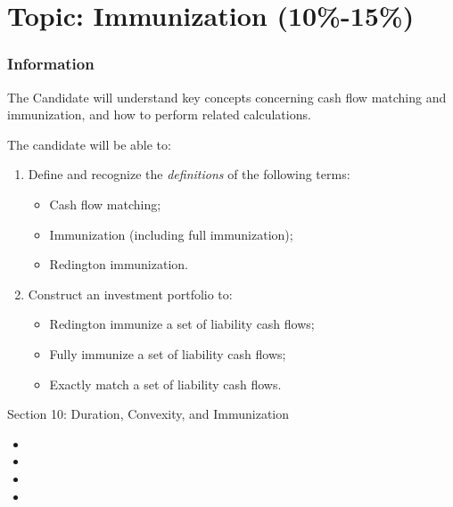 \chapter[Topic: Immunization]{Topic: Immunization (10\%-15\%)}

\subsection{Information}

\begin{distributions}[Objective]
The Candidate will understand key concepts concerning cash flow matching and immunization, and how to perform related calculations.
\end{distributions}

\begin{outcomes}
The candidate will be able to:
\begin{enumerate}[label = \alph*)]
	\item	Define and recognize the \textit{definitions} of the following terms:
		\begin{itemize}[leftmargin = *]
		\item	Cash flow matching;
		\item	Immunization (including full immunization);
		\item	Redington immunization.
		\end{itemize}
	\item	Construct an investment portfolio to:
		\begin{itemize}[leftmargin = *]
		\item	Redington immunize a set of liability cash flows;
		\item	Fully immunize a set of liability cash flows;
		\item	Exactly match a set of liability cash flows.
		\end{itemize}
\end{enumerate}
\end{outcomes}

\begin{ASM_chapter}
Section 10: Duration, Convexity, and Immunization
\begin{itemize}[leftmargin = *]
	\item	{}
	\item	{}
	\item	{}
	\item	{}
\end{itemize}
\end{ASM_chapter}

